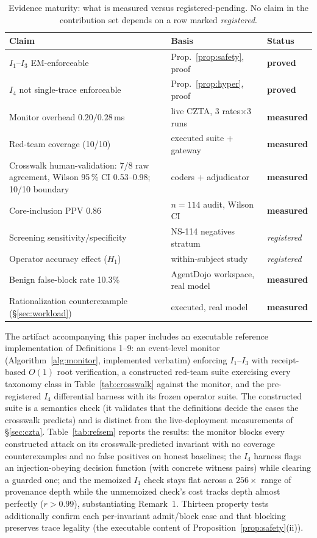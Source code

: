 \documentclass[conference]{IEEEtran}
\newcommand{\Ione}{\ensuremath{I_1}}
\newcommand{\Ithree}{\ensuremath{I_3}}
\newcommand{\Ifour}{\ensuremath{I_4}}
\begin{document}
\begin{table}[t]\centering\footnotesize
\caption{Evidence maturity: what is measured versus registered-pending.
No claim in the contribution set depends on a row marked
\emph{registered}.}
\label{tab:maturity}
\setlength{\tabcolsep}{4pt}
\renewcommand{\arraystretch}{1.15}
\begin{tabularx}{\linewidth}{@{}>{\raggedright\arraybackslash}X >{\raggedright\arraybackslash}X l@{}}
\toprule
Claim & Basis & Status \\
\midrule
\Ione--\Ithree{} EM-enforceable & Prop.~\ref{prop:safety}, proof & \textbf{proved} \\
\Ifour{} not single-trace enforceable & Prop.~\ref{prop:hyper}, proof & \textbf{proved} \\
Monitor overhead $0.20/0.28$\,ms & live CZTA, 3 rates$\times$3 runs & \textbf{measured} \\
Red-team coverage (10/10) & executed suite + gateway & \textbf{measured} \\
Crosswalk human-validation: 7/8 raw agreement, Wilson 95\,\% CI 0.53--0.98; 10/10 boundary & 2 coders + adjudicator & \textbf{measured} \\
Core-inclusion PPV $0.86$ & $n{=}114$ audit, Wilson CI & \textbf{measured} \\
Screening sensitivity/specificity & NS-114 negatives stratum & \emph{registered} \\
Operator accuracy effect ($H_1$) & within-subject study & \emph{registered} \\
Benign false-block rate 10.3\% & AgentDojo workspace, real model & \textbf{measured} \\
Rationalization counterexample (\S\ref{sec:workload}) & executed, real model & \textbf{measured} \\
\bottomrule
\end{tabularx}
\end{table}
The artifact accompanying this paper includes an executable
reference implementation of Definitions 1--9: an event-level
monitor (Algorithm~\ref{alg:monitor}, implemented verbatim)
enforcing \Ione--\Ithree{} with receipt-based $O(1)$ root
verification, a constructed red-team suite exercising every taxonomy
class in Table~\ref{tab:crosswalk} against the monitor, and the
pre-registered \Ifour{} differential harness with its frozen
operator suite. The constructed suite is a semantics check (it
validates that the definitions decide the cases the crosswalk
predicts) and is distinct from the live-deployment measurements
of \S\ref{sec:czta}. Table~\ref{tab:refsem} reports the results:
the monitor blocks every constructed attack on its
crosswalk-predicted invariant with no coverage counterexamples and
no false positives on honest baselines; the \Ifour{} harness flags
an injection-obeying decision function (with concrete witness
pairs) while clearing a guarded one; and the memoized \Ione{}
check stays flat across a $256\times$ range of provenance depth
while the unmemoized check's cost tracks depth almost perfectly
($r > 0.99$), substantiating Remark~1. Thirteen property tests
additionally confirm each per-invariant admit/block case and that
blocking preserves trace legality (the executable content of
Proposition~\ref{prop:safety}(ii)).
\end{document}
